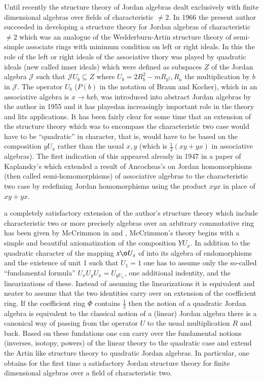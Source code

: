 Until recently the structure theory of Jordan algebras dealt
exclusively with finite dimensional algebras over fields of
characteristic $\neq 2$. In 1966 the present author succeeded in
developing a structure theory for Jordan algebras of characteristic
$\neq 2$ which was an analogue of the Wedderburn-Artin structure
theory of semi-simple associate rings with minimum condition on left
or right ideals. In this the role of the left or right ideals of the
associative thory was played by quadratic ideals (new called inner
ideals) which were defined as subspaces $Z$ of the Jordan algebra
$\mathscr{J}$ such that $\mathscr{J} U_b \subseteq Z$ where $U_b = 2
R_b^2 -m R_{b^2}, R_a$ the multiplication by $b$ in $\mathscr{J}$. The
operator $U_b$ ($P(b)$ in the notation  of Braun and Kocher), which in
an associative algebra is $x \to b x b$, was introduced into abstract
Jordan algebras by the author in 1955 and it has playedan increasingly
important role in the theory and lits applications. It has been fairly
clear for some time that an extension of the structure theory which
was to encompass the characteristic two case would have to be
``quadratic'' in character, that is, would have to be based on the
composition $y U_x$ rather than the usual $x, y$ (which is
$\frac{1}{2}(xy + yx)$ in associative algebras). The first indication
of this appeared already in 1947 in a paper of Kaplansky's which
extended a result of Ancocheas's on Jordan homomorphisms (then called
semi-homomorphisms) of  associative algebras to the characteristic two
case by redefining Jordan homomorphisms using the product $xyx$ in
place of $xy+ yx$.

a completely satisfactory extension of the author's structure theory
which include characteristic two or more precisely algebras over an
arbitrary commutative ring has been given by McCrimmon in
\cite{McCrimmon1} and \cite{McCrimmon2}, McCrimmon's theory begins
with a simple and beautiful axiomatization of the composition
$YU_x$. In addition to the quadratic character of the mapping $x \o
U_x$ of into its algebra of endomorphisms and the existence of unit 1
such that $U_1=1$ one has to assume only the so-called ``fundamental
formula'' $U_x U_y U_x = U_{yU_x}$, one additional  indentity, and the
linearizations of these. Instead of assuming the linearizations it is
equivalent and neater to assume that the two identities carry over on
extension of the coefficient ring. If the coefficient ring $\Phi$
contains $\frac{1}{2}$ then the notion of a quadratic Jordan algebra
is equivalent to the classical notion of a (linear) Jordan algebra
there is a canonical way of passing from the operator $U$ to the usual
multiplication $R$ and back. Based on these fundations one can carry
over the fundamental notions (inverses, isotopy, powers) of the linear
theory to the quadratic case and extend the Artin like structure
theory to quadratic Jordan algebras. In particular, one obtains for
the first time a satisfactory Jordan structure theory for finite
dimensional algebras over a field of characteristic two.

